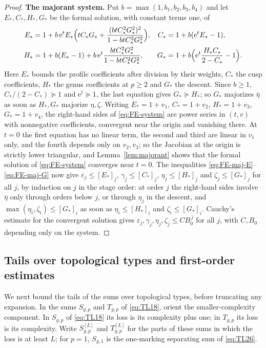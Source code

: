 \begin{proof}
\textbf{The majorant system.} Put $b=\max(1,b_1,b_2,b_3,b_4)$ and let
$E_*,C_*,H_*,G_*$ be the formal solution, with constant terms one, of
\begin{equation}
\begin{aligned}
 E_*&=1+b\,\mathrm{e}^{t}E_*\Bigl(tC_*G_*+\frac{(btC_*^2G_*^2)^2}{1-btC_*^2G_*^2}\Bigr),&
 C_*&=1+b(\mathrm{e}^{t}E_*-1),\\
 H_*&=1+b(E_*-1)+b\,\mathrm{e}^{t}\frac{btC_*^2G_*^2}{1-btC_*^2G_*^2},&
 G_*&=1+b\Bigl(\mathrm{e}^{t}\frac{H_*C_*}{2-C_*}-1\Bigr).
\end{aligned}
\label{eq:FE-system}
\end{equation}
Here $E_*$ bounds the profile coefficients after division by their
weights, $C_*$ the cusp coefficients, $H_*$ the genus coefficients at
$p\ge2$ and $G_*$ the descent. Since $b\ge1$, $C_*/(2-C_*)\succeq1$ and
$\mathrm{e}^t\succeq1$, the last equation gives $G_*\succeq H_*$; so
$G_*$ majorizes $\bar\eta$ as soon as $H_*,G_*$ majorize $\eta,\zeta$.
Writing $E_*=1+v_1$, $C_*=1+v_2$, $H_*=1+v_3$, $G_*=1+v_4$, the
right-hand sides of \eqref{eq:FE-system} are power series in $(t,v)$ with
nonnegative coefficients, convergent near the origin and vanishing there.
At $t=0$ the first equation has no linear term, the second and third are
linear in $v_1$ only, and the fourth depends only on $v_2,v_3$; so the
Jacobian at the origin is strictly lower triangular, and
Lemma~\ref{lem:majorant} shows that the formal solution of
\eqref{eq:FE-system} converges near $t=0$. The inequalities
\eqref{eq:FE-maj-E}--\eqref{eq:FE-maj-G} now give
$\varepsilon_j\le[E_*]_j$, $\gamma_j\le[C_*]_j$, $\eta_j\le[H_*]_j$ and
$\zeta_j\le[G_*]_j$ for all $j$, by induction on $j$ in the stage order:
at order $j$ the right-hand sides involve $\bar\eta$ only through orders
below $j$, or through $\eta_j$ in the descent, and
$\max(\eta_i,\zeta_i)\le[G_*]_i$ as soon as $\eta_i\le[H_*]_i$ and
$\zeta_i\le[G_*]_i$. Cauchy's estimate for the convergent solution gives
$\varepsilon_j,\gamma_j,\eta_j,\zeta_j\le CB_0^{\,j}$ for all $j$, with
$C,B_0$ depending only on the system.
\end{proof}

\subsection{Tails over topological types and first-order estimates}\label{app:tails}

We next bound the tails of the sums over topological types, before
truncating any expansion. In the sums $S_{g,p}$ and $T_{g,p}$ of
\eqref{eq:TL18}, orient the smaller-complexity component. In $S_{g,p}$ of \eqref{eq:TL18} its loss is its complexity
plus one; in $T_{g,p}$ its loss is its complexity. Write
$S_{g,p}^{[L]}$ and $T_{g,p}^{[L]}$ for the parts of these sums in which
the loss is at least $L$; for $p=1$, $S_{g,1}$ is the one-marking
separating sum of \eqref{eq:TL26}.

